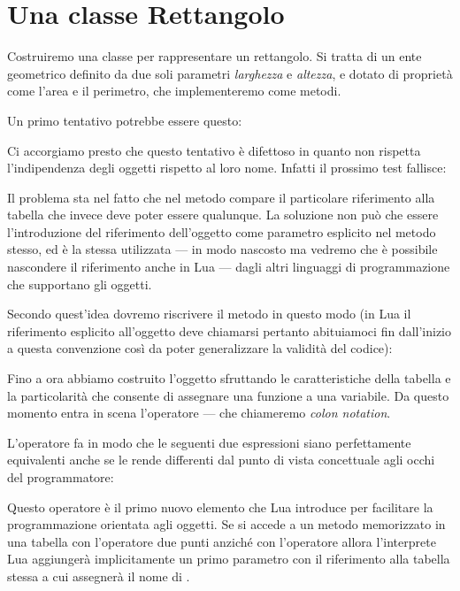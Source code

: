 \section{Una classe Rettangolo}
\label{secRectOop}

Costruiremo una classe per rappresentare un rettangolo. Si tratta di un ente
geometrico definito da due soli parametri \emph{larghezza} e \emph{altezza}, e
dotato di proprietà come l'area e il perimetro, che implementeremo come metodi.

Un primo tentativo potrebbe essere questo:

Ci accorgiamo presto che questo tentativo è difettoso in quanto non rispetta
l'indipendenza degli oggetti rispetto al loro nome. Infatti il prossimo test
fallisce:

Il problema sta nel fatto che nel metodo  compare il particolare
riferimento alla tabella  che invece deve poter essere qualunque.
La soluzione non può che essere l'introduzione del riferimento dell'oggetto come
parametro esplicito nel metodo stesso, ed è la stessa utilizzata --- in modo
nascosto ma vedremo che è possibile nascondere il riferimento anche in Lua ---
dagli altri linguaggi di programmazione che supportano gli oggetti.

Secondo quest'idea dovremo riscrivere il metodo  in questo modo (in
Lua il riferimento esplicito all'oggetto deve chiamarsi  pertanto
abituiamoci fin dall'inizio a questa convenzione così da poter generalizzare la
validità del codice):

Fino a ora abbiamo costruito l'oggetto sfruttando le caratteristiche della
tabella e la particolarità che consente di assegnare una funzione a una
variabile. Da questo momento entra in scena l'operatore \key{:} --- che
chiameremo \emph{colon notation}.

L'operatore \key{:} fa in modo che le seguenti due espressioni siano
perfettamente equivalenti anche se le rende differenti dal punto di vista
concettuale agli occhi del programmatore:

Questo operatore è il primo nuovo elemento che Lua introduce per facilitare la
programmazione orientata agli oggetti. Se si accede a un metodo memorizzato in
una tabella con l'operatore due punti \key{:} anziché con l'operatore 
allora l'interprete Lua aggiungerà implicitamente un primo parametro con il
riferimento alla tabella stessa a cui assegnerà il nome di .


